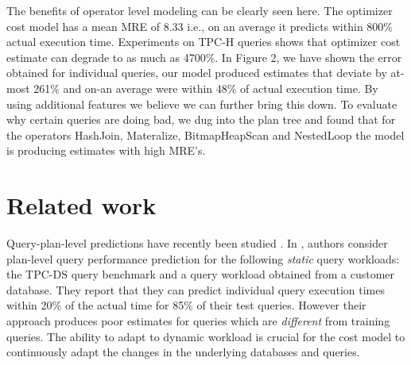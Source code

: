 \documentclass{article}
\begin{document}
\begin{multicols}{2}
	The benefits of operator level modeling can be clearly
	seen here. The optimizer cost model has a mean
	MRE of 8.33 i.e., on an average it predicts within 800\%
	actual execution time. Experiments on TPC-H queries
	shows that optimizer cost estimate can degrade to as
	much as 4700\%.
	In Figure 2, we have shown the error obtained
	for individual queries, our model produced estimates
	that deviate by at-most 261\% and on-an average were
	within 48\% of actual execution time. By using additional 
	features we believe we can further bring this
	down. To evaluate why certain queries are doing bad,
	we dug into the plan tree and found that for the operators 
	HashJoin, Materalize, BitmapHeapScan and
	NestedLoop the model is producing estimates with
	high MRE’s.
	

	\section {Related work}
	Query-plan-level predictions have recently been studied \cite{ganapathi}. In \cite{ganapathi},
	authors consider plan-level query performance prediction for the
	following \textit{static} query workloads: the TPC-DS query benchmark
	and a query workload obtained from a customer database. They
	report that they can predict individual query execution times within
	20\% of the actual time for 85\% of their test queries.	However their approach produces
	poor estimates for queries which are \textit{different} from training queries. The ability to 
	adapt to dynamic workload is crucial for the cost model to continuously adapt the changes in the
	underlying databases and queries.
	

\end{multicols}
\end{document}
